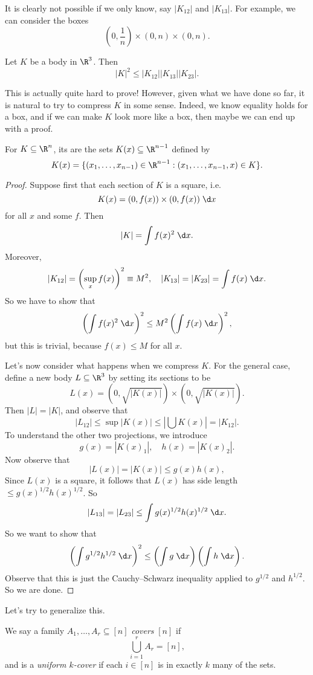 \documentclass[a4paper]{article}
\begin{document}
It is clearly not possible if we only know, say $|K_{12}|$ and $|K_{13}|$. For example, we can consider the boxes
\[
  \left(0, \frac{1}{n}\right) \times (0, n) \times (0, n).
\]
\begin{prop}
  Let $K$ be a body in $\R^3$. Then
  \[
    |K|^2 \leq |K_{12}| |K_{13}| |K_{23}|.
  \]
\end{prop}
This is actually quite hard to prove! However, given what we have done so far, it is natural to try to compress $K$ in some sense. Indeed, we know equality holds for a box, and if we can make $K$ look more like a box, then maybe we can end up with a proof.

For $K \subseteq \R^n$, its  are the sets $K(x) \subseteq \R^{n - 1}$ defined by
\[
  K(x) = \{(x_1, \ldots, x_{n - 1}) \in \R^{n - 1}: (x_1, \ldots, x_{n - 1}, x) \in K\}.
\]
\begin{proof}
  Suppose first that each section of $K$ is a square, i.e.
  \[
    K(x) = (0, f(x)) \times (0, f(x))\;\d x
  \]
  for all $x$ and some $f$. Then
  \[
    |K| = \int f(x)^2\;\d x.
  \]
  Moreover,
  \[
    |K_{12}| = \left(\sup_x f(x)\right)^2 \equiv M^2,\quad |K_{13}| = |K_{23}| = \int f(x)\;\d x.
  \]
  So we have to show that
  \[
    \left(\int f(x)^2\;\d x\right)^2 \leq M^2 \left(\int f(x)\;\d x \right)^2,
  \]
  but this is trivial, because $f(x) \leq M$ for all $x$.

  Let's now consider what happens when we compress $K$. For the general case, define a new body $L \subseteq \R^3$ by setting its sections to be
  \[
    L(x) = (0, \sqrt{|K(x)|}) \times (0, \sqrt{|K(x)|}).
  \]
  Then $|L| = |K|$, and observe that
  \[
    |L_{12}| \leq \sup |K(x)| \leq \left|\bigcup K(x)\right| = |K_{12}|.
  \]
  To understand the other two projections, we introduce
  \[
    g(x) = |K(x)_1|,\quad h(x) = |K(x)_2|.
  \]
  Now observe that
  \[
    |L(x)| = |K(x)| \leq g(x) h(x),
  \]
  Since $L(x)$ is a square, it follows that $L(x)$ has side length $\leq g(x)^{1/2} h(x)^{1/2}$. So
  \[
    |L_{13}| = |L_{23}| \leq \int g(x)^{1/2} h(x)^{1/2}\;\d x.
  \]
  So we want to show that
  \[
    \left(\int g^{1/2}h^{1/2} \;\d x\right)^2 \leq \left(\int g\;\d x\right)\left(\int h\;\d x\right).
  \]
  Observe that this is just the Cauchy--Schwarz inequality applied to $g^{1/2}$ and $h^{1/2}$. So we are done.
\end{proof}

Let's try to generalize this.
\begin{defi}
  We say a family $A_1, \ldots, A_r \subseteq [n]$ \emph{covers} $[n]$ if
  \[
    \bigcup_{i = 1}^r A_r = [n],
  \]
  and is a \emph{uniform $k$-cover} if each $i \in [n]$ is in exactly $k$ many of the sets.
\end{defi}
\end{document}
